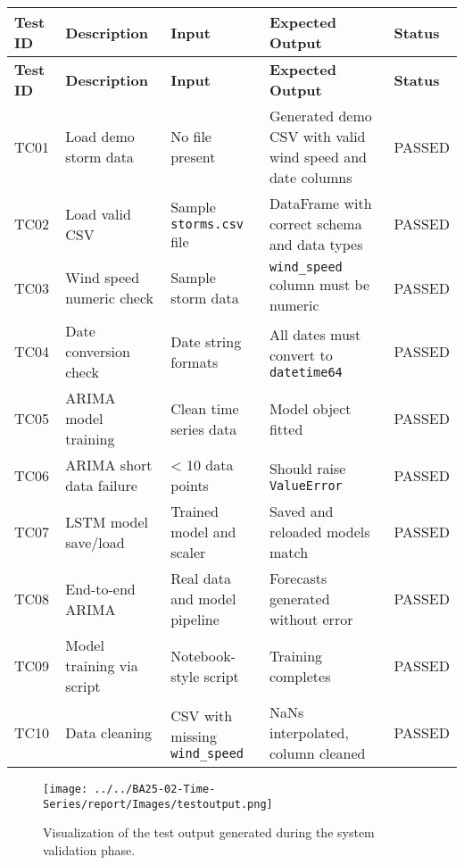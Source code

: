 \footnotesize %
\begin{longtable}{|p{1.5cm}|p{3.8cm}|p{3.0cm}|p{3.3cm}|p{1.5cm}|}
	\hline
	\textbf{Test ID} & \textbf{Description} & \textbf{Input} & \textbf{Expected Output} & \textbf{Status} \\
	\hline
	\endfirsthead
	
	\hline
	\textbf{Test ID} & \textbf{Description} & \textbf{Input} & \textbf{Expected Output} & \textbf{Status} \\
	\hline
	\endhead
	
	TC01 & Load demo storm data & No file present & Generated demo CSV with valid wind speed and date columns & PASSED \\
	\hline
	TC02 & Load valid CSV & Sample \texttt{storms.csv} file & DataFrame with correct schema and data types & PASSED \\
	\hline
	TC03 & Wind speed numeric check & Sample storm data & \texttt{wind\_speed} column must be numeric & PASSED \\
	\hline
	TC04 & Date conversion check & Date string formats & All dates must convert to \texttt{datetime64} & PASSED \\
	\hline
	TC05 & ARIMA model training & Clean time series data & Model object fitted & PASSED \\
	\hline
	TC06 & ARIMA short data failure & \textless{} 10 data points & Should raise \texttt{ValueError} & PASSED \\
	\hline
	TC07 & LSTM model save/load & Trained model and scaler & Saved and reloaded models match & PASSED \\
	\hline
	TC08 & End-to-end ARIMA & Real data and model pipeline & Forecasts generated without error & PASSED \\
	\hline
	TC09 & Model training via script & Notebook-style script & Training completes & PASSED \\
	\hline
	TC10 & Data cleaning & CSV with missing \texttt{wind\_speed} & NaNs interpolated, column cleaned & PASSED \\
	\hline
\end{longtable}

\begin{figure}[H]
	\centering
	\texttt{[image: ../../BA25-02-Time-Series/report/Images/testoutput.png]}
	\caption[Visualization of Test Output Results]{
		Visualization of the test output generated during the system validation phase.
	}
	\label{fig:testoutput}
\end{figure}










